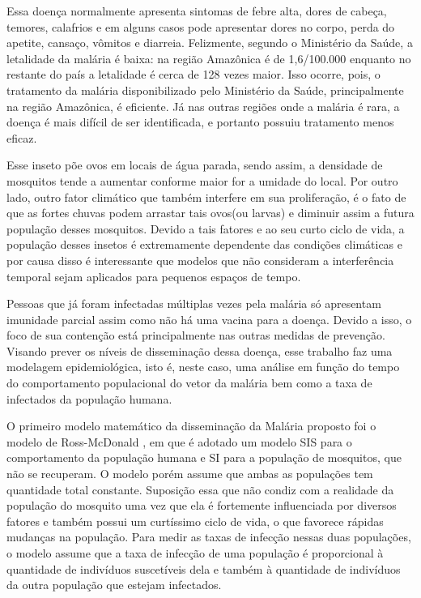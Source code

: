 \documentclass[
	12pt,				%
	openright,			%
	twoside,			%
	a4paper,			%
	english,			%
	french,				%
	spanish,			%
	brazil				%
	]{abntex2}
\begin{document}
Essa doença normalmente apresenta sintomas de febre alta, dores de cabeça, temores, calafrios e em alguns casos pode apresentar dores no corpo, perda do apetite, cansaço, vômitos e diarreia. Felizmente, segundo o Ministério da Saúde, a letalidade da malária é baixa: na região Amazônica é de 1,6/100.000 \cite{SUS} enquanto no restante do país a letalidade é cerca de 128 vezes maior. Isso ocorre, pois, o tratamento da malária disponibilizado pelo Ministério da Saúde,  principalmente na região Amazônica, é eficiente. Já nas outras regiões onde a malária é rara, a doença é mais difícil de ser identificada, e portanto possuiu tratamento menos eficaz.    


Esse inseto põe ovos em locais de água parada, sendo assim, a densidade de mosquitos tende a aumentar conforme maior for a umidade do local. Por outro lado, outro fator climático que também interfere em sua proliferação, é o fato de que as fortes chuvas podem arrastar tais ovos(ou larvas) e diminuir assim a futura população desses mosquitos. Devido a tais fatores e ao seu curto ciclo de vida, a população desses insetos é extremamente dependente das condições climáticas e por causa disso é interessante que modelos que não consideram a interferência temporal sejam aplicados para pequenos espaços de tempo.

Pessoas que já foram infectadas múltiplas vezes pela malária só apresentam imunidade parcial assim como não há uma vacina para a doença. Devido a isso, o foco de sua contenção está principalmente nas outras medidas de prevenção. Visando prever os níveis de disseminação dessa doença, esse trabalho faz uma modelagem epidemiológica, isto é, neste caso, uma análise em função do tempo do comportamento populacional do vetor da malária bem como a taxa de infectados da população humana.

O primeiro modelo matemático da disseminação da Malária proposto foi o modelo de Ross-McDonald \cite{ndacherenga2019modelos}, em que é adotado um modelo SIS para o comportamento da população humana e SI para a população de mosquitos, que não se recuperam. O modelo porém assume que ambas as populações tem quantidade total constante. Suposição essa que não condiz com a realidade da população do mosquito uma vez que ela é fortemente influenciada por diversos fatores e também possui um curtíssimo ciclo de vida, o que favorece rápidas mudanças na população. Para medir as taxas de infecção nessas duas populações, o modelo assume que a taxa de infecção de uma população é proporcional à quantidade de indivíduos suscetíveis dela e também à quantidade de indivíduos da outra população que estejam infectados.
\end{document}
